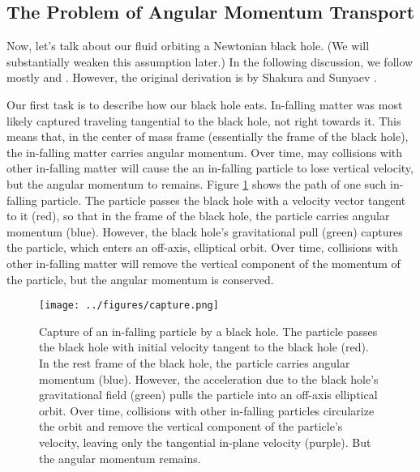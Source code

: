 \documentclass[]{article}
\begin{document}
\subsection{The Problem of Angular Momentum Transport}
\label{subsec:angular:momentum:transport}

Now, let's talk about our fluid orbiting a Newtonian black hole. (We
will substantially weaken this assumption later.) In the following
discussion, we follow mostly \cite{Frank} and \cite{Melia}. However,
the original derivation is by Shakura and Sunyaev
\cite{ShakuraSunyaev73}.

Our first task is to describe how our black hole eats. In-falling
matter was most likely captured traveling tangential to the black
hole, not right towards it. This means that, in the center of mass
frame (essentially the frame of the black hole), the in-falling matter
carries angular momentum. Over time, may collisions with other
in-falling matter will cause the an in-falling particle to lose
vertical velocity, but the angular momentum to remains. Figure
\ref{fig:capture} shows the path of one such in-falling particle. The
particle passes the black hole with a velocity vector tangent to it
(red), so that in the frame of the black hole, the particle carries
angular momentum (blue). However, the black hole's gravitational pull
(green) captures the particle, which enters an off-axis, elliptical
orbit. Over time, collisions with other in-falling matter will remove
the vertical component of the momentum of the particle, but the
angular momentum is conserved.
\begin{figure}[htb]
  \begin{center}
    \leavevmode
    \texttt{[image: ../figures/capture.png]}
    \caption[Capture of an in-falling particle]{Capture of an
      in-falling particle by a black hole. The particle passes the
      black hole with initial velocity tangent to the black hole
      (red). In the rest frame of the black hole, the particle
      carries angular momentum (blue). However, the acceleration due
      to the black hole's gravitational field (green) pulls the
      particle into an off-axis elliptical orbit. Over time,
      collisions with other in-falling particles circularize the orbit
      and remove the vertical component of the particle's velocity,
      leaving only the tangential in-plane velocity (purple). But the
      angular momentum remains.}
      \label{fig:capture}
  \end{center}
\end{figure}
\end{document}
